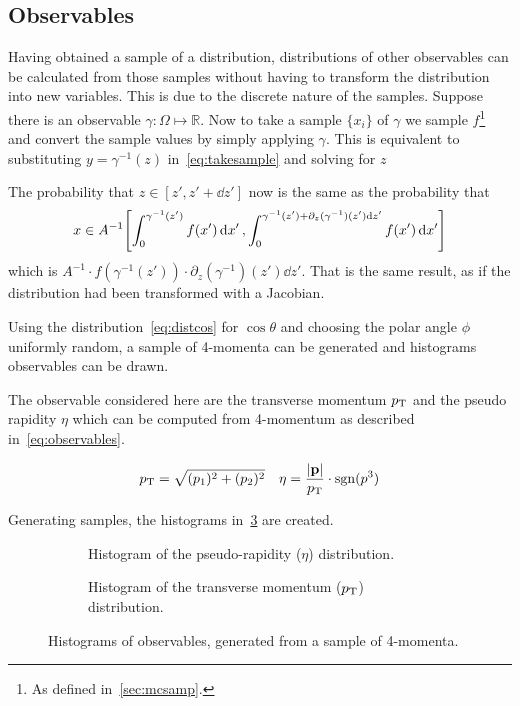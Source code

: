 \subsection{Observables}
\label{sec:obs}

Having obtained a sample of a distribution, distributions of other
observables can be calculated from those samples without having to
transform the distribution into new variables. This is due to the
discrete nature of the samples. Suppose there is an observable
\(\gamma\colon\Omega\mapsto\mathbb{R}\). Now to take a sample
\(\{x_i\}\) of \(\gamma\) we sample \(f\)\footnote{As defined
  in~\ref{sec:mcsamp}.} and convert the sample values by simply
applying \(\gamma\). This is equivalent to
substituting \(y=\gamma^{-1}(z)\) in~\eqref{eq:takesample} and solving
for \(z\)

The probability that \(z\in[z', z'+\dd{z'}]\) now is the same as the
probability that
\[\displaystyle x\in
  A^{-1}\qty[\int_{0}^{\gamma^{-1}(z')}f(x')\dd{x'},
  \int_{0}^{\gamma^{-1}(z')+\partial_z(\gamma^{-1})(z')\dd{z'}}f(x')\dd{x'}]\]
which is
\(A^{-1}\cdot f(\gamma^{-1}(z'))\cdot \partial_z(\gamma^{-1})(z')\dd{z'}\). That
is the same result, as if the distribution had been transformed with a
Jacobian.

Using the distribution~\eqref{eq:distcos} for \(\cos\theta\) and
choosing the polar angle \(\phi\) uniformly random, a sample of
4-momenta can be generated and histograms observables can be drawn.

The observable considered here are the transverse momentum \(p_\mathrm{T}\) and
the pseudo rapidity \(\eta\) which can be computed from 4-momentum as
described in~\eqref{eq:observables}.

\begin{align}
  \label{eq:observables}
  p_\mathrm{T} &= \sqrt{(p_1)^2+(p_2)^2} & \eta &=
                                         \frac{\abs{\vb{p}}}{p_\mathrm{T}}\cdot\operatorname{sgn}(p^3) \\
\end{align}

Generating  samples, the histograms
in~\ref{fig:histos} are created.

\begin{figure}[ht]
  \centering
  \begin{subfigure}[b]{.49\textwidth}
    \centering
    \caption{\label{fig:histeta} Histogram of the pseudo-rapidity
      (\(\eta\)) distribution.}
  \end{subfigure}
  \begin{subfigure}[b]{.49\textwidth}
    \centering
    \caption{\label{fig:histpt} Histogram of the transverse momentum
      (\(p_\mathrm{T}\)) distribution.}
  \end{subfigure}
  \caption{\label{fig:histos} Histograms of observables, generated
    from a sample of 4-momenta.}
\end{figure}

